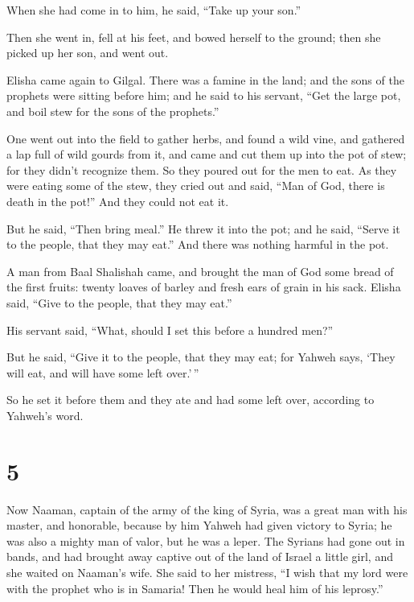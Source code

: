 When she had come in to him, he said, ``Take up your son.''

 Then she went in, fell at his feet, and bowed herself to
the ground; then she picked up her son, and went out.

 Elisha came again to Gilgal. There was a famine in the
land; and the sons of the prophets were sitting before him; and he said
to his servant, ``Get the large pot, and boil stew for the sons of the
prophets.''

 One went out into the field to gather herbs, and found a
wild vine, and gathered a lap full of wild gourds from it, and came and
cut them up into the pot of stew; for they didn't recognize them.
 So they poured out for the men to eat. As they were
eating some of the stew, they cried out and said, ``Man of God, there is
death in the pot!'' And they could not eat it.

 But he said, ``Then bring meal.'' He threw it into the
pot; and he said, ``Serve it to the people, that they may eat.'' And
there was nothing harmful in the pot.

 A man from Baal Shalishah came, and brought the man of
God some bread of the first fruits: twenty loaves of barley and fresh
ears of grain in his sack. Elisha said, ``Give to the people, that they
may eat.''

 His servant said, ``What, should I set this before a
hundred men?''

But he said, ``Give it to the people, that they may eat; for Yahweh
says, `They will eat, and will have some left over.'\,''

 So he set it before them and they ate and had some left
over, according to Yahweh's word.

\hypertarget{section-4}{%
\section{5}\label{section-4}}

 Now Naaman, captain of the army of the king of Syria, was
a great man with his master, and honorable, because by him Yahweh had
given victory to Syria; he was also a mighty man of valor, but he was a
leper.  The Syrians had gone out in bands, and had brought
away captive out of the land of Israel a little girl, and she waited on
Naaman's wife.  She said to her mistress, ``I wish that my
lord were with the prophet who is in Samaria! Then he would heal him of
his leprosy.''

